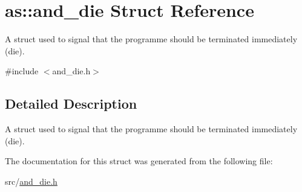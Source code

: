 \hypertarget{structas_1_1and__die}{}\section{as\+:\+:and\+\_\+die Struct Reference}
\label{structas_1_1and__die}


A struct used to signal that the programme should be terminated immediately (die).  




{\ttfamily \#include $<$and\+\_\+die.\+h$>$}



\subsection{Detailed Description}
A struct used to signal that the programme should be terminated immediately (die). 

The documentation for this struct was generated from the following file\+:\begin{DoxyCompactItemize}
\item 
src/\hyperlink{and__die_8h}{and\+\_\+die.\+h}\end{DoxyCompactItemize}
